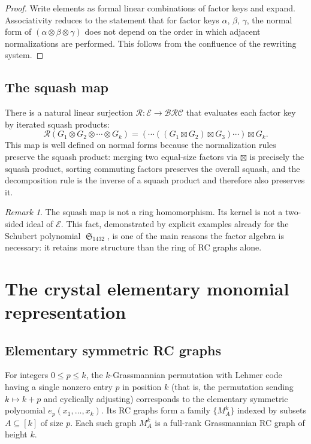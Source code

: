 \documentclass{amsart}
\theoremstyle{definition}
\theoremstyle{remark}
\newtheorem*{remark}{Remark}
\numberwithin{equation}{section}
\DeclareMathOperator{\sch}{\mathfrak{S}}
\newcommand{\BRC}{\mathcal{BRC}}
\begin{document}
\begin{proof}
Write elements as formal linear combinations of factor keys and expand.  Associativity reduces to the statement that for factor keys $\alpha$, $\beta$, $\gamma$, the normal form of $(\alpha \otimes \beta \otimes \gamma)$ does not depend on the order in which adjacent normalizations are performed.  This follows from the confluence of the rewriting system.
\end{proof}

\subsection{The squash map}

There is a natural linear surjection $\mathcal{R} : \mathcal{E} \to \BRC$ that evaluates each factor key by iterated squash products:
\[
\mathcal{R}(G_1 \otimes G_2 \otimes \cdots \otimes G_k) = (\cdots((G_1 \boxtimes G_2) \boxtimes G_3) \cdots) \boxtimes G_k.
\]
This map is well defined on normal forms because the normalization rules preserve the squash product: merging two equal-size factors via $\boxtimes$ is precisely the squash product, sorting commuting factors preserves the overall squash, and the decomposition rule is the inverse of a squash product and therefore also preserves it.

\begin{remark}
The squash map is not a ring homomorphism.  Its kernel is not a two-sided ideal of $\mathcal{E}$.  This fact, demonstrated by explicit examples already for the Schubert polynomial $\sch_{1432}$, is one of the main reasons the factor algebra is necessary: it retains more structure than the ring of RC graphs alone.
\end{remark}



\section{The crystal elementary monomial representation}\label{section:cem}

\subsection{Elementary symmetric RC graphs}

For integers $0 \leq p \leq k$, the $k$-Grassmannian permutation with Lehmer code having a single nonzero entry $p$ in position $k$ (that is, the permutation sending $k \mapsto k + p$ and cyclically adjusting) corresponds to the elementary symmetric polynomial $e_p(x_1, \ldots, x_k)$.  Its RC graphs form a family $\{M_A^k\}$ indexed by subsets $A \subseteq [k]$ of size $p$.  Each such graph $M_A^k$ is a full-rank Grassmannian RC graph of height $k$.
\end{document}
